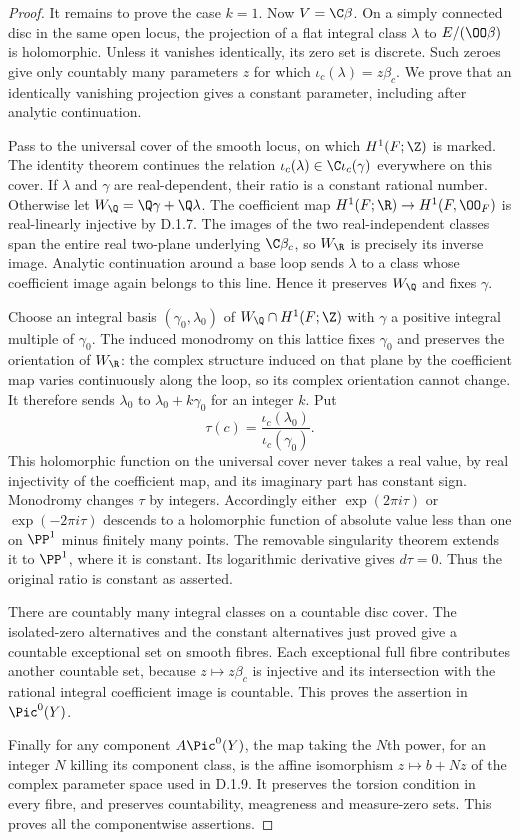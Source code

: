 \begin{proof}
It remains to prove the case $k=1$.
Now $V=\C\beta$. On a simply connected disc in the same open locus,
the projection of a flat integral class $\lambda$ to
$E/(\OO\beta)$ is holomorphic. Unless it vanishes identically,
its zero set is discrete. Such zeroes give only countably many
parameters $z$ for which $\iota_c(\lambda)=z\beta_c$.
We prove that an identically vanishing projection gives a constant
parameter, including after analytic continuation.

Pass to the universal cover of the smooth locus, on which
$H^1(F;\Z)$ is marked. The identity theorem continues the relation
$\iota_c(\lambda)\in\C\iota_c(\gamma)$ everywhere on this cover.
If $\lambda$ and $\gamma$ are real-dependent, their ratio is a
constant rational number. Otherwise let
$W_{\Q}=\Q\gamma+\Q\lambda$. The coefficient map
$H^1(F;\R)\to H^1(F,\OO_F)$ is real-linearly injective by D.1.7.
The images of the two real-independent classes span the entire
real two-plane underlying $\C\beta_c$, so $W_{\R}$ is precisely
its inverse image. Analytic continuation around a base loop
sends $\lambda$ to a class whose coefficient image again belongs
to this line. Hence it preserves $W_{\Q}$ and fixes $\gamma$.

Choose an integral basis $(\gamma_0,\lambda_0)$ of
$W_{\Q}\cap H^1(F;\Z)$ with $\gamma$ a positive integral multiple
of $\gamma_0$. The induced monodromy on this lattice fixes
$\gamma_0$ and preserves the orientation of $W_{\R}$: the complex
structure induced on that plane by the coefficient map varies
continuously along the loop, so its complex orientation cannot change.
It therefore sends $\lambda_0$ to $\lambda_0+k\gamma_0$ for an
integer $k$. Put
\[
\tau(c)=\frac{\iota_c(\lambda_0)}{\iota_c(\gamma_0)}.
\]
This holomorphic function on the universal cover never takes a
real value, by real injectivity of the coefficient map, and its
imaginary part has constant sign. Monodromy changes $\tau$ by
integers. Accordingly either $\exp(2\pi i\tau)$ or
$\exp(-2\pi i\tau)$ descends to a holomorphic function of absolute
value less than one on $\PP^1$ minus finitely many points. The
removable singularity theorem extends it to $\PP^1$, where it is
constant. Its logarithmic derivative gives $d\tau=0$. Thus the
original ratio is constant as asserted.

There are countably many integral classes on a countable disc
cover. The isolated-zero alternatives and the constant alternatives
just proved give a countable exceptional set on smooth fibres.
Each exceptional full fibre contributes another countable set,
because $z\mapsto z\beta_c$ is injective and its intersection with
the rational integral coefficient image is countable. This proves
the assertion in $\Pic^0(Y)$.

Finally for any component $A\Pic^0(Y)$, the map taking the $N$th
power, for an integer $N$ killing its component class, is the affine
isomorphism $z\mapsto b+Nz$ of the complex parameter space used
in D.1.9. It preserves the torsion condition in every fibre, and
preserves countability, meagreness and measure-zero sets. This
proves all the componentwise assertions.
\end{proof}

